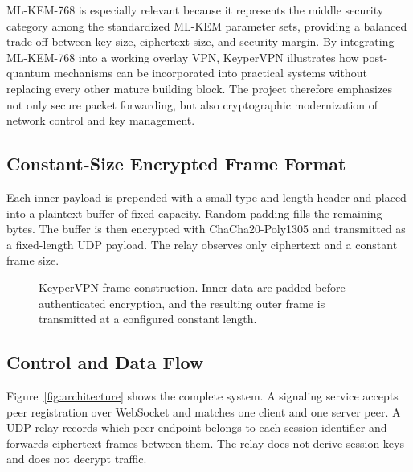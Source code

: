 \documentclass[conference]{IEEEtran}
\begin{document}
ML-KEM-768 is especially relevant because it represents the middle security category among the standardized ML-KEM parameter sets, providing a balanced trade-off between key size, ciphertext size, and security margin. By integrating ML-KEM-768 into a working overlay VPN, KeyperVPN illustrates how post-quantum mechanisms can be incorporated into practical systems without replacing every other mature building block. The project therefore emphasizes not only secure packet forwarding, but also cryptographic modernization of network control and key management.

\subsection{Constant-Size Encrypted Frame Format}
Each inner payload is prepended with a small type and length header and placed into a plaintext buffer of fixed capacity. Random padding fills the remaining bytes. The buffer is then encrypted with ChaCha20-Poly1305 and transmitted as a fixed-length UDP payload. The relay observes only ciphertext and a constant frame size.

\begin{figure}[t]
\centering
{}
\caption{KeyperVPN frame construction. Inner data are padded before authenticated encryption, and the resulting outer frame is transmitted at a configured constant length.}
\label{fig:frame}
\end{figure}

\subsection{Control and Data Flow}
Figure~\ref{fig:architecture} shows the complete system. A signaling service accepts peer registration over WebSocket and matches one client and one server peer. A UDP relay records which peer endpoint belongs to each session identifier and forwards ciphertext frames between them. The relay does not derive session keys and does not decrypt traffic.
\end{document}
